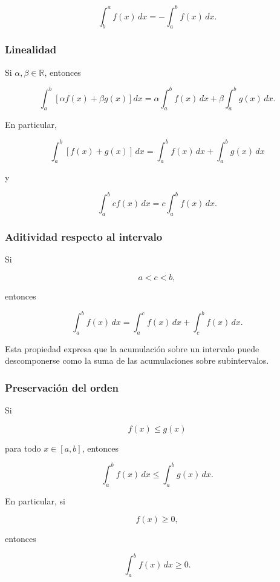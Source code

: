 \documentclass[12pt]{article}
\begin{document}
\[
\int_b^a f(x)\,dx
=
-\int_a^b f(x)\,dx.
\]


\subsubsection*{Linealidad}

Si $\alpha,\beta\in\mathbb{R}$, entonces

\[
\boxed{
\int_a^b
\left[
\alpha f(x)+\beta g(x)
\right]dx
=
\alpha\int_a^b f(x)\,dx
+
\beta\int_a^b g(x)\,dx.
}
\]

En particular,

\[
\int_a^b [f(x)+g(x)]\,dx
=
\int_a^b f(x)\,dx
+
\int_a^b g(x)\,dx
\]

y

\[
\int_a^b cf(x)\,dx
=
c\int_a^b f(x)\,dx.
\]


\subsubsection*{Aditividad respecto al intervalo}

Si

\[
a<c<b,
\]

entonces

\[
\boxed{
\int_a^b f(x)\,dx
=
\int_a^c f(x)\,dx
+
\int_c^b f(x)\,dx.
}
\]

Esta propiedad expresa que la acumulación sobre un intervalo puede
descomponerse como la suma de las acumulaciones sobre subintervalos.


\subsubsection*{Preservación del orden}

Si

\[
f(x)\leq g(x)
\]

para todo $x\in[a,b]$, entonces

\[
\boxed{
\int_a^b f(x)\,dx
\leq
\int_a^b g(x)\,dx.
}
\]

En particular, si

\[
f(x)\geq0,
\]

entonces

\[
\int_a^b f(x)\,dx\geq0.
\]
\end{document}
